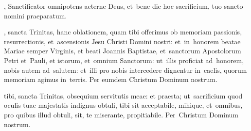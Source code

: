 \documentclass[third]{../altarcard}
\begin{document}
\begin{center}
\begin{minipage}[t]{0.29\linewidth}
		\gap

		, Sanctificator omnipotens aeterne Deus, et~bene\cross
		dic hoc sacrificium, tuo sancto nomini praeparatum.

		\gap

		, sancta Trinitas, hanc oblationem, quam tibi
		offerimus ob memoriam passionis, resurrectionis, et~ascensionis Jesu
		Christi Domini nostri: et~in~honorem beatae Mariae semper Virginis, et
		beati Joannis Baptistae, et~sanctorum Apostolorum Petri et~Pauli, et
		istorum, et~omnium Sanctorum: ut~illis proficiat ad~honorem, nobis autem
		ad~salutem: et~illi pro nobis intercedere dignentur in~caelis, quorum
		memoriam agimus in~terris. Per eumdem Christum Dominum nostrum. \amen

		\gap

		 tibi, sancta Trinitas, obsequium servitutis meae: et
		praesta; ut~sacrificium quod oculis tuae majestatis indignus obtuli,
		tibi sit acceptabile, mihique, et~omnibus, pro quibus illud obtuli, sit,
		te miserante, propitiabile. Per~Christum Dominum nostrum. \amen

	\end{minipage}
\end{center}

\end{document}
